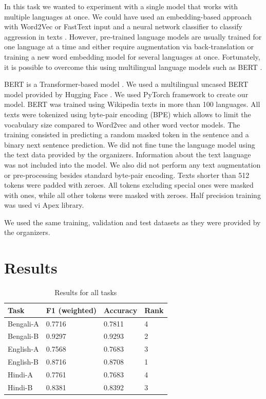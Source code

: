\documentclass[10pt, a4paper]{article}
\begin{document}
In this task we wanted to experiment with a single model that works with multiple languages at once. We could have used an embedding-based approach with Word2Vec \cite{word2vec} or FastText \cite{fasttext} input and a neural network classifier to classify aggression in texts \cite{gordeev2016}. However, pre-trained language models are usually trained for one language at a time and either require augmentation via back-translation \cite{Aroyehun} or training a new word embedding model for several languages at once. Fortunately, it is possible to overcome this using multilingual language models such as BERT \cite{bert}.

BERT is a Transformer-based model \cite{attention}. We used a multilingual uncased BERT model provided by Hugging Face \cite{Wolf2019HuggingFacesTS}. We used PyTorch framework to create our model. BERT was trained using Wikipedia texts in more than 100 languages. All texts were tokenized using byte-pair encoding (BPE) which allows to limit the vocabulary size compared to Word2vec and other word vector models. The training consisted in predicting a random masked token in the sentence and a binary next sentence prediction. We did not fine tune the language model using the text data provided by the organizers. Information about the text language was not included into the model. We also did not perform any text augmentation or pre-processing besides standard byte-pair encoding. Texts shorter than 512 tokens were padded with zeroes. All tokens excluding special ones were masked with ones, while all other tokens were masked with zeroes.
Half precision training was used vi Apex library.

We used the same training, validation and test datasets as they were provided by the organizers.


\section{Results}
\label{sec:results}

\begin{table}[h]
\begin{tabular}{|llll|}
\hline
\bf Task & \bf F1 (weighted) & \bf Accuracy & \bf Rank\\ 
\hline
\hline
Bengali-A & 0.7716 & 0.7811 & 4\\  \hline
Bengali-B & 0.9297 & 0.9293 & 2\\  \hline
English-A & 0.7568 & 0.7683 & 3\\ \hline
English-B & 0.8716 & 0.8708 & 1\\ \hline
Hindi-A & 0.7761 & 0.7683 & 4\\  \hline
Hindi-B & 0.8381 & 0.8392 & 3\\  \hline
\end{tabular}
\caption{Results for all tasks}
\label{tab:results}
\end{table}
\end{document}
